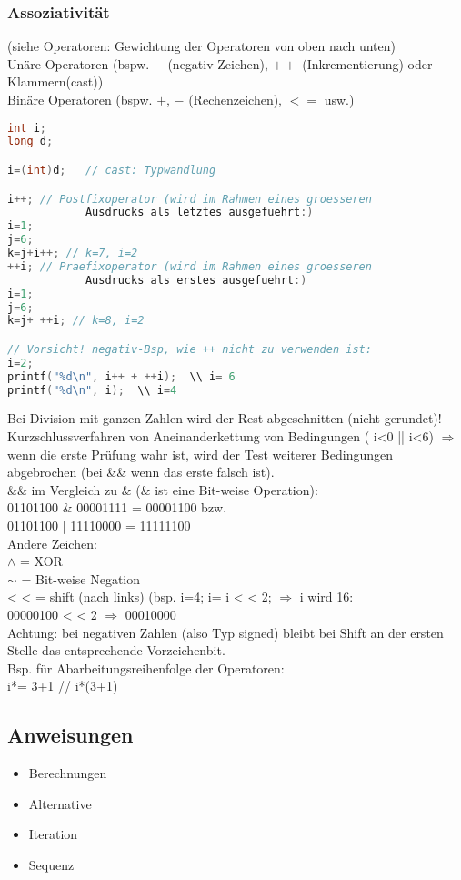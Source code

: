 \subsubsection{Assoziativität}
(siehe Operatoren: Gewichtung der Operatoren von oben nach unten)\medskip\\
Unäre Operatoren (bspw. $-$ (negativ-Zeichen), $++$ (Inkrementierung) oder Klammern(cast))\\
Binäre Operatoren (bspw. $+$, $-$ (Rechenzeichen), $<=$ usw.)
\begin{lstlisting}[language=C]
int i;
long d;

i=(int)d;	// cast: Typwandlung

i++; // Postfixoperator (wird im Rahmen eines groesseren 
			Ausdrucks als letztes ausgefuehrt:)
i=1;
j=6;
k=j+i++; // k=7, i=2
++i; // Praefixoperator (wird im Rahmen eines groesseren 
			Ausdrucks als erstes ausgefuehrt:)
i=1;
j=6;
k=j+ ++i; // k=8, i=2

// Vorsicht! negativ-Bsp, wie ++ nicht zu verwenden ist:
i=2;
printf("%d\n", i++ + ++i);	\\ i= 6
printf("%d\n", i);	\\ i=4
\end{lstlisting}
Bei Division mit ganzen Zahlen wird der Rest abgeschnitten (nicht gerundet)!\medskip\\
Kurzschlussverfahren von Aneinanderkettung von Bedingungen ( i<0 || i<6) $\Rightarrow$ wenn die erste Prüfung wahr ist, wird der Test weiterer Bedingungen abgebrochen (bei \&\& wenn das erste falsch ist).\bigskip\\
\&\& im Vergleich zu \& (\& ist eine Bit-weise Operation): \\
01101100 \& 00001111 = 00001100 bzw. \\
01101100 | 11110000 = 11111100 \smallskip\\
Andere Zeichen: \\
$\wedge$ = XOR\\
$\sim$ = Bit-weise Negation\\
<\! < = shift (nach links) (bsp. i=4; i= i <\! < 2; $\Rightarrow$ i wird 16:\\
00000100 <\! < 2 $\Rightarrow$ 00010000\\
Achtung: bei negativen Zahlen (also Typ signed) bleibt bei Shift an der ersten Stelle das entsprechende Vorzeichenbit.\\
Bsp. für Abarbeitungsreihenfolge der Operatoren:\\
i*= 3+1		// i*(3+1)
\subsection{Anweisungen}
\begin{itemize}
\item Berechnungen
\item Alternative
\item Iteration
\item Sequenz
\end{itemize}
